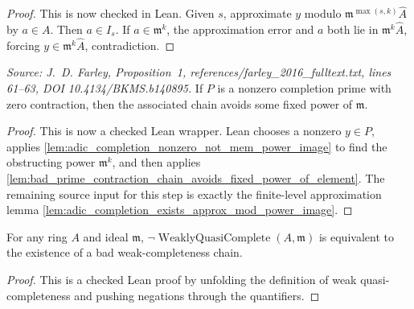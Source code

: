 \begin{proof}
  This is now checked in Lean.  Given \(s\), approximate \(y\) modulo
  \(\mathfrak m^{\max(s,k)}\widehat A\) by \(a\in A\).  Then
  \(a\in I_s\).  If \(a\in\mathfrak m^k\), the approximation error and
  \(a\) both lie in \(\mathfrak m^k\widehat A\), forcing
  \(y\in\mathfrak m^k\widehat A\), contradiction.
\end{proof}

\begin{lemma}
  \label{lem:bad_prime_contraction_chain_avoids_fixed_power}
  \textit{Source: J.~D. Farley, Proposition~1,
  references/farley\_2016\_fulltext.txt, lines 61--63,
  DOI 10.4134/BKMS.b140895.}
  If \(P\) is a nonzero completion prime with zero contraction, then the
  associated chain avoids some fixed power of \(\mathfrak m\).
\end{lemma}

\begin{proof}
  This is now a checked Lean wrapper.  Lean chooses a nonzero
  \(y\in P\), applies
  \cref{lem:adic_completion_nonzero_not_mem_power_image} to find the
  obstructing power \(\mathfrak m^k\), and then applies
  \cref{lem:bad_prime_contraction_chain_avoids_fixed_power_of_element}.  The
  remaining source input for this step is exactly the finite-level
  approximation lemma
  \cref{lem:adic_completion_exists_approx_mod_power_image}.
\end{proof}

\begin{lemma}
  \label{lem:not_weakly_quasi_complete_iff_bad_chain}
  For any ring \(A\) and ideal \(\mathfrak m\),
  \(\neg\operatorname{WeaklyQuasiComplete}(A,\mathfrak m)\) is equivalent to
  the existence of a bad weak-completeness chain.
\end{lemma}

\begin{proof}
  This is a checked Lean proof by unfolding the definition of weak
  quasi-completeness and pushing negations through the quantifiers.
\end{proof}

